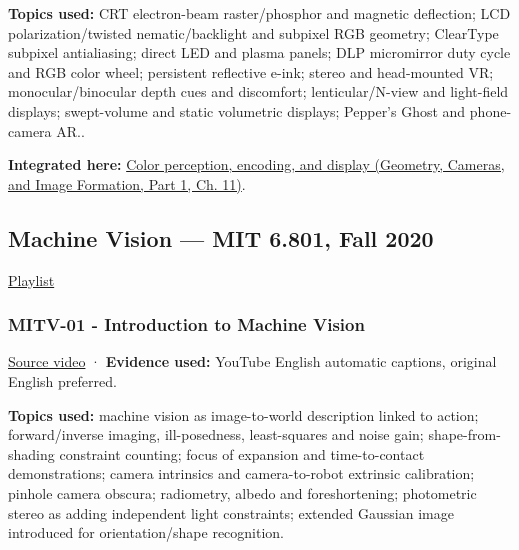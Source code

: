 \textbf{Topics used:} CRT electron-beam raster/phosphor and magnetic deflection; LCD polarization/twisted nematic/backlight and subpixel RGB geometry; ClearType subpixel antialiasing; direct LED and plasma panels; DLP micromirror duty cycle and RGB color wheel; persistent reflective e-ink; stereo and head-mounted VR; monocular/binocular depth cues and discomfort; lenticular/N-view and light-field displays; swept-volume and static volumetric displays; Pepper's Ghost and phone-camera AR..

\textbf{Integrated here:} \href{../03-Geometry-Cameras-and-Image-Formation-P01/main.pdf\#nameddest=03-visual-computing-i-ch004-color-perception-encoding-and-display}{Color perception, encoding, and display (Geometry, Cameras, and Image Formation, Part 1, Ch. 11)}.

\subsection{Machine Vision --- MIT 6.801, Fall 2020}\label{04-visual-computing-ii-ch036-machine-vision-mit-6.801-fall-2020}

\hypertarget{04-visual-computing-ii-ch036-machine-vision-mit-6.801-fall-2020}{}

\href{https://www.youtube.com/playlist?list=PLUl4u3cNGP63pfpS1gV5P9tDxxL_e4W8O}{Playlist}

\subsubsection{MITV-01 - Introduction to Machine Vision}\label{04-visual-computing-ii-ch036-mitv-01---introduction-to-machine-vision}

\hypertarget{04-visual-computing-ii-ch036-mitv-01---introduction-to-machine-vision}{}

\href{https://www.youtube.com/watch?v=tY2gczObpfU}{Source video} · \textbf{Evidence used:} YouTube English automatic captions, original English preferred.

\textbf{Topics used:} machine vision as image-to-world description linked to action; forward/inverse imaging, ill-posedness, least-squares and noise gain; shape-from-shading constraint counting; focus of expansion and time-to-contact demonstrations; camera intrinsics and camera-to-robot extrinsic calibration; pinhole camera obscura; radiometry, albedo and foreshortening; photometric stereo as adding independent light constraints; extended Gaussian image introduced for orientation/shape recognition.

